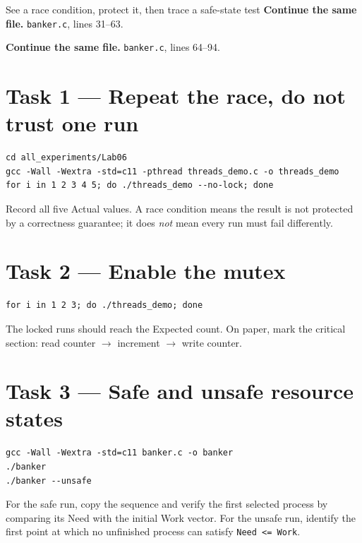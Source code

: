 \begin{labproject}{See a race condition, protect it, then trace a safe-state test}
\noindent\textbf{Continue the same file.} \texttt{banker.c}, lines 31--63.


\noindent\textbf{Continue the same file.} \texttt{banker.c}, lines 64--94.


\section*{Task 1 --- Repeat the race, do not trust one run}
\begin{lstlisting}[style=utpbash]
cd all_experiments/Lab06
gcc -Wall -Wextra -std=c11 -pthread threads_demo.c -o threads_demo
for i in 1 2 3 4 5; do ./threads_demo --no-lock; done
\end{lstlisting}
Record all five Actual values. A race condition means the result is not protected by a correctness guarantee; it does \emph{not} mean every run must fail differently.

\section*{Task 2 --- Enable the mutex}
\begin{lstlisting}[style=utpbash]
for i in 1 2 3; do ./threads_demo; done
\end{lstlisting}
The locked runs should reach the Expected count. On paper, mark the critical section: read counter $\rightarrow$ increment $\rightarrow$ write counter.

\section*{Task 3 --- Safe and unsafe resource states}
\begin{lstlisting}[style=utpbash]
gcc -Wall -Wextra -std=c11 banker.c -o banker
./banker
./banker --unsafe
\end{lstlisting}
For the safe run, copy the sequence and verify the first selected process by comparing its Need with the initial Work vector. For the unsafe run, identify the first point at which no unfinished process can satisfy \texttt{Need <= Work}.


\end{labproject}
